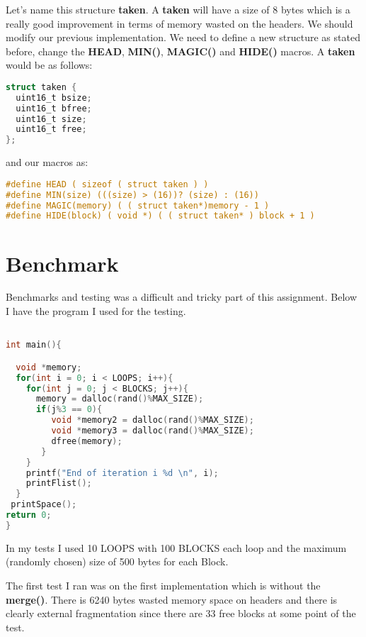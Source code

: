 \documentclass[a4paper,10pt]{article}
\begin{document}
Let's name this structure \textbf{taken}. A \textbf{taken} will have a size of 8 bytes which is a really good improvement in terms of memory wasted on the headers. We should modify our previous implementation. We need to define a new structure as stated before, change the \textbf{HEAD}, \textbf{MIN()}, \textbf{MAGIC()} and \textbf{HIDE()} macros.
A \textbf{taken} would be as follows:

\vspace{5mm}
\begin{lstlisting}[language=C]
struct taken {
  uint16_t bsize;
  uint16_t bfree;
  uint16_t size;
  uint16_t free;
};
\end{lstlisting}

and our macros as:

\vspace{5mm}
\begin{lstlisting}[language=C]
#define HEAD ( sizeof ( struct taken ) )
#define MIN(size) (((size) > (16))? (size) : (16))
#define MAGIC(memory) ( ( struct taken*)memory - 1 )
#define HIDE(block) ( void *) ( ( struct taken* ) block + 1 )
\end{lstlisting}

\section*{Benchmark}
Benchmarks and testing was a difficult and tricky part of this assignment. Below I have the program I used for the testing.

\vspace{5mm}
\begin{lstlisting}[language=C]

int main(){

  void *memory;
  for(int i = 0; i < LOOPS; i++){
    for(int j = 0; j < BLOCKS; j++){
      memory = dalloc(rand()%MAX_SIZE);
      if(j%3 == 0){
         void *memory2 = dalloc(rand()%MAX_SIZE);
         void *memory3 = dalloc(rand()%MAX_SIZE);
         dfree(memory);
       }
    }
    printf("End of iteration i %d \n", i);
    printFlist();
  }
 printSpace();
return 0;
}
\end{lstlisting}

In my tests I used 10 LOOPS with 100 BLOCKS each loop and the maximum (randomly chosen) size of 500 bytes for each Block.

The first test I ran was on the first implementation which is without the \textbf{merge()}. There is 6240 bytes wasted memory space on headers and there is clearly external fragmentation since there are 33 free blocks at some point of the test.
\end{document}

